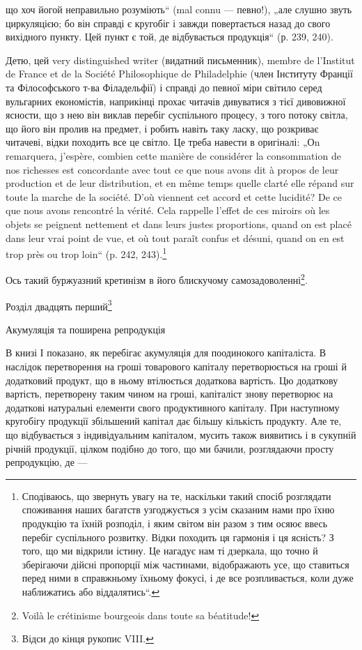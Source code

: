 \parcont{}  %
що хоч йогой неправильно розуміють“ (mal connu — певно!), „але слушно звуть циркуляцією; бо він
справді є кругобіг і завжди повертається назад до свого вихідного пункту. Цей пункт є той, де
відбувається продукція“ (р. 239, 240).

Детю, цей very distinguished writer (видатний письменник), membre de l’Institut de France et de la
Société Philosophique de Philadelphie (член Інституту Франції та Філософського т-ва Філадельфії) і
справді до певної міри світило серед вульгарних економістів, наприкінці прохає читачів дивуватися з
тієї дивовижної ясности, що з нею він виклав перебіг суспільного процесу, з того потоку світла, що
його він пролив на предмет, і робить навіть таку ласку, що розкриває читачеві, відки походить все це
світло. Це треба навести в оригіналі: „Оn remarquera, j’espère, combien cette manière de considérer
la consommation de nos richesses est concordante avec tout ce que nous avons dit à propos de leur
production et de leur distribution, et en même temps quelle clarté elle répand sur toute la marche
de la société. D'où viennent cet accord et cette lucidité? De ce que nous avons rencontré la vérité.
Cela rappelle l’effet de ces miroirs où les objets se peignent nettement et dans leurs justes
proportions, quand on est placé dans leur vrai point de vue, et où tout paraît confus et désuni,
quand on en est trop près ou trop loin“ (p. 242, 243).\footnote*{
Сподіваюсь, що звернуть увагу на те, наскільки такий спосіб розглядати споживання наших багатств
узгоджується з усім сказаним нами про їхню продукцію та їхній розподіл, і яким світом він разом з
тим осяює ввесь перебіг суспільного розвитку. Відки походить ця гармонія і ця ясність? З того, що ми
відкрили істину. Це нагадує нам ті дзеркала, що точно й зберігаючи дійсні пропорції між частинами,
відображають усе, що ставиться перед ними в справжньому їхньому фокусі, і де все розпливається, коли
дуже наближатись або віддалятись“.
}

Ось такий буржуазний кретинізм в його блискучому самозадоволенні\footnote*{
Voilà le crétinisme bourgeois dans toute sa béatitude!
}.

Розділ двадцять перший\footnote{
Відси до кінця рукопис VIII.
}

Акумуляція та поширена репродукція

В книзі І показано, як перебігає акумуляція для поодинокого капіталіста. В наслідок перетворення на
гроші товарового капіталу перетворюється на гроші й додатковий продукт, що в ньому втілюється
додаткова вартість. Цю додаткову вартість, перетворену таким чином на гроші, капіталіст знову
перетворює на додаткові натуральні елементи свого продуктивного капіталу. При наступному кругобігу
продукції збільшений капітал дає більшу кількість продукту. Але те, що відбувається з індивідуальним
капіталом, мусить також виявитись і в сукупній річній продукції, цілком подібно до того, що ми
бачили, розглядаючи просту репродукцію, де —
\parbreak{}  %
